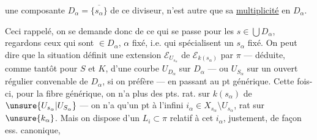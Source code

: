 une composante $D_\alpha=\overline{\{s_\alpha\}}$ de ce diviseur, n'est autre que sa \uline{multiplicité} en $D_\alpha$.

Ceci rappelé, on se demande donc de ce qui se passe pour les $s\in\bigcup D_\alpha$,    regardons ceux qui sont $\in D_\alpha$, $\alpha$ fixé, i.e. qui spécialisent un $s_\alpha$ fixé. On peut dire que la situation définit une extension $\mathcal E_{U_{s_\alpha}}$ de $\mathcal E_{k(s_\alpha)}$ par $\pi$ --- déduite, comme tantôt pour $S$ et $K$, d'une courbe  $U_{D_\alpha}$ sur $D_\alpha$ --- ou $U_{S_\alpha}$ sur un ouvert régulier convenable de $D_\alpha$, si on préfère --- en passant au pt générique. Cette fois-ci, pour la fibre générique, on n'a plus des  pts. rat. sur $k(s_\alpha)$ de $\unsure{U_{s_\alpha}|U_{S_\alpha}}$ --- on n'a qu'un pt à l'infini $i_\alpha\in X_{s_\alpha}\setminus U_{s_\alpha}$, rat sur $\unsure{k_\alpha}$. Mais on dispose  d'un $L_i\subset\pi$ relatif à cet $i_\alpha$, justement, de façon ess. canonique,
